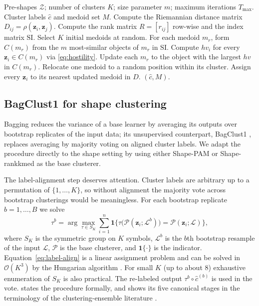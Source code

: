 \documentclass[review,11pt,3p,authoryear]{elsarticle}
\newcommand{\bz}{\mathbf{z}}
\newcommand{\bigOh}{\mathcal{O}}
\begin{document}
\begin{algorithm}[!htbp]
\caption{Shape-rankkmed: Ranked $K$-medoids on Kendall's 2D shape space.}
\label{alg:rkm-shape}
\begin{algorithmic}[1]
\Require Pre-shapes $\mathcal{Z}$; number of clusters $K$; size
         parameter $m$; maximum iterations $T_{\max}$.
\Ensure  Cluster labels $\hat c$ and medoid set $M$.
\State Compute the Riemannian distance matrix
       $D_{ij}=\rho(\bz_i,\bz_j)$.
\State Compute the rank matrix $R=[r_{ij}]$ row-wise and the index
       matrix $\mathrm{SI}$.
\State Select $K$ initial medoids at random.
\Repeat
  \State For each medoid $m_r$, form $C(m_r)$ from the $m$
         most-similar objects of $m_r$ in $\mathrm{SI}$.
  \State Compute $hv_i$ for every $\bz_i\in C(m_r)$ via
         \eqref{eq:hostility}. Update each $m_r$ to the object with the
         largest $hv$ in $C(m_r)$.
  \State Relocate one medoid to a random position within its cluster.
\State Assign every $\bz_i$ to its nearest updated medoid in $D$.
\State \Return $(\hat c, M)$.
\end{algorithmic}
\end{algorithm}

\subsection{BagClust1 for shape clustering}
\label{subsec:bagclust}

Bagging \citep{breiman1996bagging} reduces the variance of a base
learner by averaging its outputs over bootstrap replicates of the input
data; its unsupervised counterpart, BagClust1
\citep{dudoit2003bagging}, replaces averaging by majority voting on
aligned cluster labels. We adapt the procedure directly to the shape
setting by using either Shape-PAM or Shape-rankkmed as the base
clusterer.

The label-alignment step deserves attention. Cluster labels are
arbitrary up to a permutation of $\{1,\ldots,K\}$, so without
alignment the majority vote across bootstrap clusterings would be
meaningless. For each bootstrap replicate $b=1,\ldots,B$ we solve
\begin{equation}
  \label{eq:label-align}
  \tau^b = \arg\max_{\tau \in S_K}
   \sum_{i=1}^{n}
   \mathbf{1}\!\bigl\{\tau\!\bigl(\mathcal{P}(\bz_i;\mathcal{L}^b)\bigr)
                     = \mathcal{P}(\bz_i;\mathcal{L})\bigr\},
\end{equation}
where $S_K$ is the symmetric group on $K$ symbols, $\mathcal{L}^b$ is
the $b$th bootstrap resample of the input $\mathcal{L}$, $\mathcal{P}$
is the base clusterer, and $\mathbf{1}\{\cdot\}$ is the indicator.
Equation~\eqref{eq:label-align} is a linear assignment problem and can
be solved in $\bigOh(K^3)$ by the Hungarian algorithm
\citep{kuhn1955hungarian}. For small $K$ (up to about $8$) exhaustive
enumeration of $S_K$ is also practical. The re-labeled output
$\tau^b\circ\hat c^{(b)}$ is used in the vote.  states the procedure formally, and
 shows its five canonical stages in the terminology of
the clustering-ensemble literature
\citep{ghaemi2009survey,golalipour2021clustering}.
\end{document}

